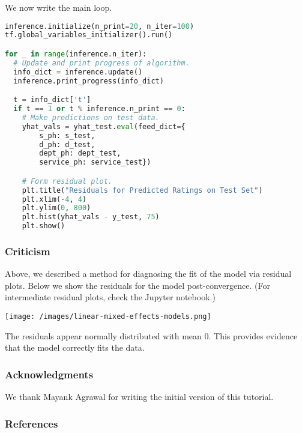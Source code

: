 We now write the main loop.

\begin{lstlisting}[language=Python]
inference.initialize(n_print=20, n_iter=100)
tf.global_variables_initializer().run()

for _ in range(inference.n_iter):
  # Update and print progress of algorithm.
  info_dict = inference.update()
  inference.print_progress(info_dict)

  t = info_dict['t']
  if t == 1 or t % inference.n_print == 0:
    # Make predictions on test data.
    yhat_vals = yhat_test.eval(feed_dict={
        s_ph: s_test,
        d_ph: d_test,
        dept_ph: dept_test,
        service_ph: service_test})

    # Form residual plot.
    plt.title("Residuals for Predicted Ratings on Test Set")
    plt.xlim(-4, 4)
    plt.ylim(0, 800)
    plt.hist(yhat_vals - y_test, 75)
    plt.show()
\end{lstlisting}

\subsubsection{Criticism}

Above, we described a method for diagnosing the fit of the model via
residual plots.
Below we show the residuals for the model post-convergence. (For
intermediate residual plots, check the Jupyter notebook.)

\texttt{[image: /images/linear-mixed-effects-models.png]}

The residuals appear normally distributed with mean 0. This provides
evidence that the model correctly fits the data.

\subsubsection{Acknowledgments}

We thank Mayank Agrawal for writing the initial version of this
tutorial.

\subsubsection{References}\label{references}
